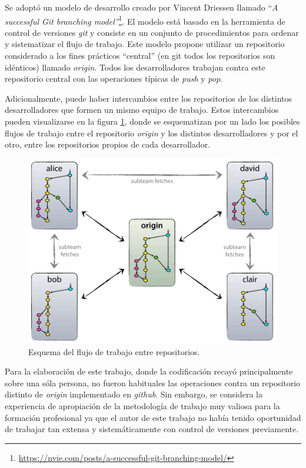 Se adoptó un modelo de desarrollo creado por Vincent Driessen llamado ``\textit{A successful Git branching model''}\footnote{\url{https://nvie.com/posts/a-successful-git-branching-model/}}.  El modelo está basado en la herramienta de control de versiones \textit{git} y consiste en un conjunto de procedimientos para ordenar y sistematizar el flujo de trabajo. Este modelo propone utilizar un repositorio considerado a los fines prácticos ``central'' (en git todos los repositorios son idénticos) llamado \textit{origin}.  Todos los desarrolladores trabajan contra este repositorio central con las operaciones típicas de \textit{push} y \textit{pop}.  

Adicionalmente, puede haber intercambios entre los repositorios de los distintos desarrolladores que formen un mismo equipo de trabajo. Estos intercambios pueden visualizarse en la figura \ref{fig:esquema-repos}, donde se esquematizan por un lado los posibles flujos de trabajo entre el repositorio \textit{origin} y los distintos desarrolladores y por el otro, entre los repositorios propios de cada desarrollador. 

\begin{figure}[h]
	\centering
	\includegraphics[width=.6\textwidth]{./Figures/centr-decentr@2x.png}
	\caption[Esquema del flujo de trabajo entre repositorios]{Esquema del flujo de trabajo entre repositorios\protect\footnotemark.}
	\label{fig:esquema-repos}
\end{figure}


Para la elaboración de este trabajo, donde la codificación recayó principalmente sobre una sóla persona, no fueron habituales las operaciones contra un repositorio distinto de \textit{origin} implementado en \textit{github}. Sin embargo, se considera la experiencia de apropiación de la metodología de trabajo muy valiosa para la formación profesional ya que el autor de este trabajo no había tenido oportunidad de trabajar tan extensa y sistemáticamente con control de versiones previamente.

